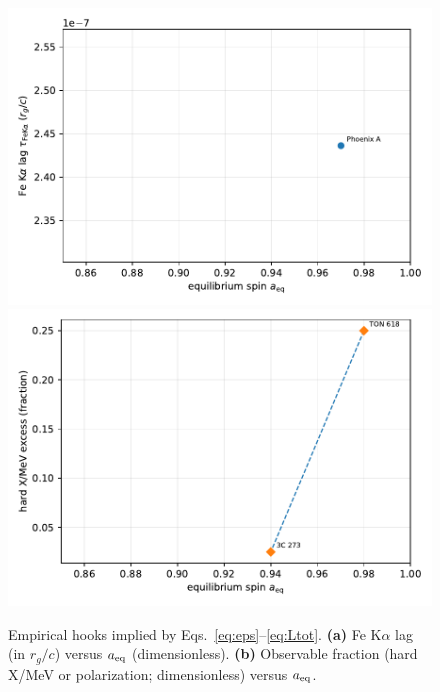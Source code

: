 \documentclass[twocolumn]{aastex701}
\newcommand{\aeq}{a_{\rm eq}}
\begin{document}
\begin{figure}[t!]
  \vspace*{2pt}
  \centering
  \includegraphics[width=.95\linewidth]{Fig5a.pdf}\\[4pt]
  \includegraphics[width=.95\linewidth]{Fig5b.pdf}
  \caption{Empirical hooks implied by Eqs.~\eqref{eq:eps}--\eqref{eq:Ltot}. 
  \textbf{(a)} Fe K$\alpha$ lag (in $r_g/c$) versus $\aeq$ (dimensionless). 
  \textbf{(b)} Observable fraction (hard X/MeV or polarization; dimensionless) versus $\aeq$.}
  \label{fig:fig5}
\end{figure}

\FloatBarrier
\end{document}
